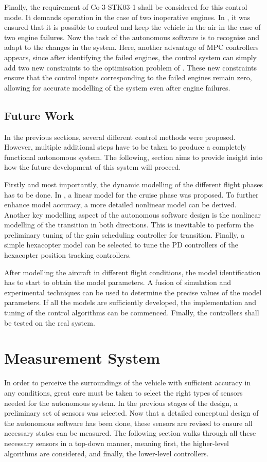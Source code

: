 Finally, the requirement of Co-3-STK03-1 shall be considered for this control mode.
It demands operation in the case of two inoperative engines.
In , it was ensured that it is possible to control and keep the vehicle in the air in the case of two engine failures.
Now the task of the autonomous software is to recognise and adapt to the changes in the system.
Here, another advantage of MPC controllers appears, since after identifying the failed engines, the control system can simply add two new constraints to the optimisation problem of .
These new constraints ensure that the control inputs corresponding to the failed engines remain zero, allowing for accurate modelling of the system even after engine failures.

\subsection{Future Work}
In the previous sections, several different control methods were proposed.
However, multiple additional steps have to be taken to produce a completely functional autonomous system.
The following, section aims to provide insight into how the future development of this system will proceed.

Firstly and most importantly, the dynamic modelling of the different flight phases has to be done.
In , a linear model for the cruise phase was proposed.
To further enhance model accuracy, a more detailed nonlinear model can be derived.
Another key modelling aspect of the autonomous software design is the nonlinear modelling of the transition in both directions.
This is inevitable to perform the preliminary tuning of the gain scheduling controller for transition.
Finally, a simple hexacopter model can be selected to tune the PD controllers of the hexacopter position tracking controllers.

After modelling the aircraft in different flight conditions, the model identification has to start to obtain the model parameters.
A fusion of simulation and experimental techniques can be used to determine the precise values of the model parameters.
If all the models are sufficiently developed, the implementation and tuning of the control algorithms can be commenced.
Finally, the controllers shall be tested on the real system.

\section{Measurement System}
In order to perceive the surroundings of the vehicle with sufficient accuracy in any conditions, great care must be taken to select the right types of sensors needed for the autonomous system.
In the previous stages of the design, a preliminary set of sensors was selected.
Now that a detailed conceptual design of the autonomous software has been done, these sensors are revised to ensure all necessary states can be measured.
The following section walks through all these necessary sensors in a top-down manner, meaning first, the higher-level algorithms are considered, and finally, the lower-level controllers.

